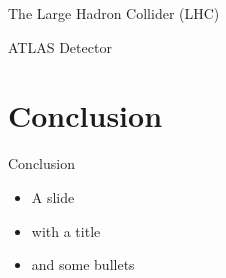 \documentclass{beamer}
\begin{document}
\begin{frame}{The Large Hadron Collider (LHC)}
\end{frame}

\begin{frame}{ATLAS Detector}
\end{frame}


\section{Conclusion}
\frame{\sectionpage}

\begin{frame}{Conclusion}
    \begin{itemize}
        \item A slide
        \item with a title
        \item and some bullets
    \end{itemize}
\end{frame}
\end{document}
